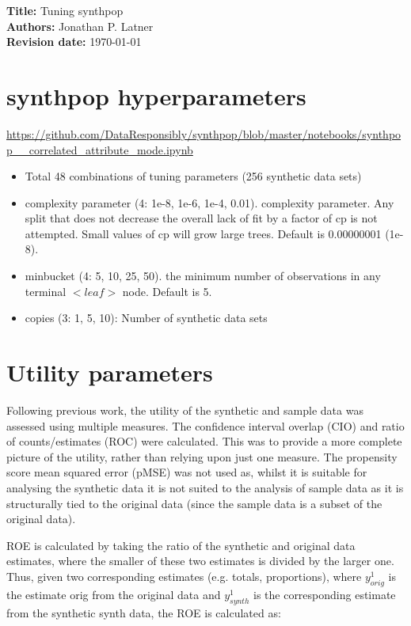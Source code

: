 \documentclass[12pt]{article}
\begin{document}
{\bf Title:} Tuning synthpop \\
{\bf Authors:} Jonathan P. Latner \\
{\bf Revision date:} \today

\section{synthpop hyperparameters}

\url{https://github.com/DataResponsibly/synthpop/blob/master/notebooks/synthpop__correlated_attribute_mode.ipynb}


\begin{itemize}
    \item Total 48 combinations of tuning parameters (256 synthetic data sets)
    \item complexity parameter (4: 1e-8, 1e-6, 1e-4, 0.01).  complexity parameter. Any split that does not decrease the overall lack of fit by a factor of cp is not attempted. Small values of cp will grow large trees.  Default is 0.00000001 (1e-8).
    \item minbucket (4: 5, 10, 25, 50). the minimum number of observations in any terminal $<leaf>$ node. Default is 5.  
    \item copies (3: 1, 5, 10): Number of synthetic data sets
\end{itemize}

\section{Utility parameters}

Following previous work, the utility of the synthetic and sample data was assessed using multiple measures. The confidence interval overlap (CIO) and ratio of counts/estimates (ROC) were calculated. This was to provide a more complete picture of the utility, rather than relying upon just one measure. The propensity score mean squared error (pMSE) was not used as, whilst it is suitable for analysing the synthetic data it is not suited to the analysis of sample data as it is structurally tied to the original data (since the sample data is a subset of the original data).

ROE is calculated by taking the ratio of the synthetic and original data estimates, where the smaller of these two estimates is divided by the larger one. Thus, given two corresponding estimates (e.g. totals, proportions), where $y^1_{orig}$ is the estimate orig from the original data and $y^1_{synth}$ is the corresponding estimate from the synthetic synth data, the ROE is calculated as:
\end{document}
